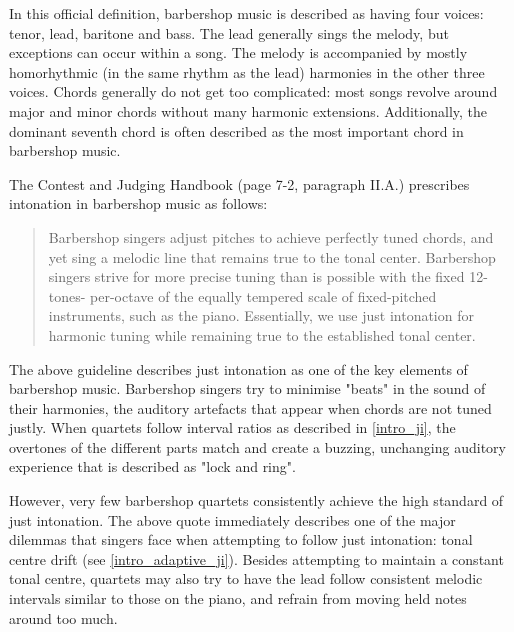 \documentclass[a4paper]{article}
\begin{document}
In this official definition, barbershop music is described as having four voices: tenor, lead, baritone and bass. The lead generally sings the melody, but exceptions can occur within a song. The melody is accompanied by mostly homorhythmic (in the same rhythm as the lead) harmonies in the other three voices. Chords generally do not get too complicated: most songs revolve around major and minor chords without many harmonic extensions. Additionally, the dominant seventh chord is often described as the most important chord in barbershop music.

The Contest and Judging Handbook (page 7-2, paragraph II.A.) prescribes intonation in barbershop music as follows:
\begin{quote}
	Barbershop singers adjust pitches to achieve perfectly tuned chords, and yet sing a melodic line that remains true to the tonal center. Barbershop singers strive for more precise tuning than is possible with the fixed 12-tones- per-octave of the equally tempered scale of fixed-pitched instruments, such as the piano. Essentially, we use just intonation for harmonic tuning while remaining true to the established tonal center.\cite{barbershop_harmony_society_contest_2022}
\end{quote}
The above guideline describes just intonation as one of the key elements of barbershop music. Barbershop singers try to minimise "beats" in the sound of their harmonies, the auditory artefacts that appear when chords are not tuned justly. When quartets follow interval ratios as described in \ref{intro_ji}, the overtones of the different parts match and create a buzzing, unchanging auditory experience that is described as "lock and ring".

However, very few barbershop quartets consistently achieve the high standard of just intonation.\cite{garnett_ethics_1999} The above quote immediately describes one of the major dilemmas that singers face when attempting to follow just intonation: tonal centre drift (see \ref{intro_adaptive_ji}). Besides attempting to maintain a constant tonal centre, quartets may also try to have the lead follow consistent melodic intervals similar to those on the piano, and refrain from moving held notes around too much.
\end{document}
